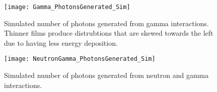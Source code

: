 \begin{figure}
  \centering
  \texttt{[image: Gamma\_PhotonsGenerated\_Sim]}
  \caption[Number of photons generated from gamma interactions]{Simulated number of photons generated from gamma interactions. Thinner films produce distrubtions that are skewed towards the left due to having less energy deposition. \SimEDeLYGeo}
  \label{fig:GammaPhotonsGenSim}
\end{figure}
\begin{figure}
  \centering
  \texttt{[image: NeutronGamma\_PhotonsGenerated\_Sim]}
  \caption[Number of photons generated of a 1 mm for neutron and gamma interactions]{Simulated number of photons generated from neutron and gamma interactions.\SimEDeLYGeo}
  \label{fig:NeutronGammaPhotonsGenSim}
\end{figure}
